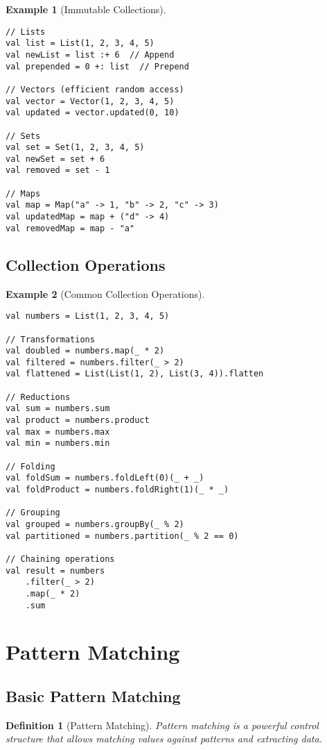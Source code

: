 \documentclass[11pt]{article}
\newtheorem{definition}{Definition}[section]
\newtheorem{example}{Example}[section]
\begin{document}
\begin{example}[Immutable Collections]
\begin{lstlisting}
// Lists
val list = List(1, 2, 3, 4, 5)
val newList = list :+ 6  // Append
val prepended = 0 +: list  // Prepend

// Vectors (efficient random access)
val vector = Vector(1, 2, 3, 4, 5)
val updated = vector.updated(0, 10)

// Sets
val set = Set(1, 2, 3, 4, 5)
val newSet = set + 6
val removed = set - 1

// Maps
val map = Map("a" -> 1, "b" -> 2, "c" -> 3)
val updatedMap = map + ("d" -> 4)
val removedMap = map - "a"
\end{lstlisting}
\end{example}

\subsection{Collection Operations}

\begin{example}[Common Collection Operations]
\begin{lstlisting}
val numbers = List(1, 2, 3, 4, 5)

// Transformations
val doubled = numbers.map(_ * 2)
val filtered = numbers.filter(_ > 2)
val flattened = List(List(1, 2), List(3, 4)).flatten

// Reductions
val sum = numbers.sum
val product = numbers.product
val max = numbers.max
val min = numbers.min

// Folding
val foldSum = numbers.foldLeft(0)(_ + _)
val foldProduct = numbers.foldRight(1)(_ * _)

// Grouping
val grouped = numbers.groupBy(_ % 2)
val partitioned = numbers.partition(_ % 2 == 0)

// Chaining operations
val result = numbers
    .filter(_ > 2)
    .map(_ * 2)
    .sum
\end{lstlisting}
\end{example}

\section{Pattern Matching}

\subsection{Basic Pattern Matching}

\begin{definition}[Pattern Matching]
Pattern matching is a powerful control structure that allows matching values against patterns and extracting data.
\end{definition}
\end{document}
